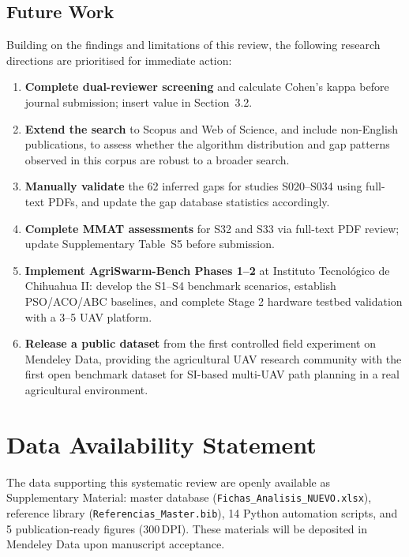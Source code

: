 \documentclass[review,3p,times]{elsarticle}
\begin{document}
\subsection{Future Work}

Building on the findings and limitations of this review, the following research directions are prioritised for immediate action:

\begin{enumerate}
  \item \textbf{Complete dual-reviewer screening} and calculate Cohen's kappa before journal submission; insert value in Section~3.2.
  \item \textbf{Extend the search} to Scopus and Web of Science, and include non-English publications, to assess whether the algorithm distribution and gap patterns observed in this corpus are robust to a broader search.
  \item \textbf{Manually validate} the 62 inferred gaps for studies S020--S034 using full-text PDFs, and update the gap database statistics accordingly.
  \item \textbf{Complete MMAT assessments} for S32 and S33 via full-text PDF review; update Supplementary Table~S5 before submission.
  \item \textbf{Implement AgriSwarm-Bench Phases 1--2} at Instituto Tecnológico de Chihuahua II: develop the S1--S4 benchmark scenarios, establish PSO/ACO/ABC baselines, and complete Stage 2 hardware testbed validation with a 3--5 UAV platform.
  \item \textbf{Release a public dataset} from the first controlled field experiment on Mendeley Data, providing the agricultural UAV research community with the first open benchmark dataset for SI-based multi-UAV path planning in a real agricultural environment.
\end{enumerate}



\section*{Data Availability Statement}
The data supporting this systematic review are openly available as Supplementary Material: master database (\texttt{Fichas\_Analisis\_NUEVO.xlsx}), reference library (\texttt{Referencias\_Master.bib}), 14 Python automation scripts, and 5 publication-ready figures (300\,DPI). These materials will be deposited in Mendeley Data upon manuscript acceptance.
\end{document}
